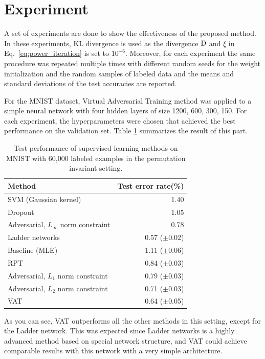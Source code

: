 \documentclass[paper=a4, fontsize=11pt]{scrartcl}
\numberwithin{equation}{section}		%
\numberwithin{figure}{section}			%
\numberwithin{table}{section}				%
\begin{document}
\section{Experiment}
A set of experiments are done to show the effectiveness of the proposed method.
In these experiments, KL divergence is used as the divergence \(\operatorname*{D}\) and \(\xi\) in Eq.~\eqref{eq:power_iteration} is set to $10^{-6}$.
Moreover, for each experiment the same procedure was repeated multiple times with different random seeds for the weight initialization and the random samples of labeled data and the means and standard deviations of the test accuracies are reported.

For the MNIST dataset, Virtual Adversarial Training method was applied to a simple neural network with four hidden layers of size 1200, 600, 300, 150.
For each experiment, the hyperparameters were chosen that achieved the best performance on the validation set. Table \ref*{tab:mnist} summarizes the result of this part.

\begin{table}[H]
\centering
\caption{Test performance of supervised learning methods
on MNIST with 60,000 labeled examples in the permutation
invariant setting.}
\label{tab:mnist}
\begin{tabular}{l r}
\hline
\hline
Method & Test error rate(\%)\\
\hline
SVM (Gaussian kernel) & 1.40\\
Dropout  & 1.05\\
Adversarial, \(L_\infty\) norm constraint &  0.78\\
Ladder networks &  0.57 (\(\pm\)0.02)\\
\hline
Baseline (MLE) & 1.11 (\(\pm\)0.06)\\
RPT & 0.84 (\(\pm\)0.03)\\
Adversarial, \(L_1\) norm constraint &0.79 (\(\pm\)0.03)\\
Adversarial, \(L_2\) norm constraint& 0.71 (\(\pm\)0.03)\\
VAT &0.64 (\(\pm\)0.05)\\
\hline
\hline
\end{tabular}
\end{table}

As you can see, VAT outperforms all the other methods in this setting, except for the Ladder network. This was expected since Ladder networks is a highly advanced method based on special network structure, and VAT could achieve comparable results with this network with a very simple architecture.
\end{document}
